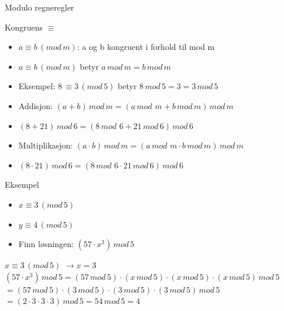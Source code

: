 \begin{frame}{Modulo regneregler}
\begin{block}{Kongruens $\equiv$}
\begin{itemize}
\item $a \equiv b\, (mod\, m)$: a og b kongruent i forhold til mod m
\item $a \equiv b\, (mod\, m)$ betyr $a\, mod\, m=b\, mod\, m$
\item Eksempel: $8\, \equiv 3\, (mod\, 5)$ betyr $8\, mod\, 5=3=3\, mod\, 5$ 
\end{itemize}
\end{block}

\begin{itemize}
\item Addisjon: $(a+b)\, mod\, m = (a\,mod\, \,m + b\, mod\, m)\, mod\, m$
\item $(8+21)\, mod\, 6 = (8\,mod\, \,6 + 21\, mod\, 6)\, mod\, 6$
\item Multiplikasjon: $(a\cdot b)\, mod\, m = (a\,mod\, \,m \cdot b\, mod\, m)\, mod\, m$
\item $(8\cdot21)\, mod\, 6 = (8\,mod\, \,6 \cdot 21\, mod\, 6)\, mod\, 6$
\end{itemize}
\end{frame}

\begin{frame}{}
\begin{exampleblock}{Eksempel}
\begin{itemize}
\item $x \equiv 3\,(mod\, 5)$
\item $y \equiv 4\,(mod\, 5)$
\item Finn løsningen: $(57\cdot x^3)\, mod\,5$
\end{itemize}
\end{exampleblock}
\medskip

$x \equiv 3\,(mod\, 5)$ $\rightarrow x=3$\\
$(57\cdot x^3)\, mod\,5=(57\, mod\, 5)\cdot (x\, mod\, 5)\cdot (x\, mod\, 5)\cdot (x\, mod\, 5)\, mod\, 5$\\
$=(57\, mod\, 5)\cdot (3\, mod\, 5)\cdot (3\, mod\, 5)\cdot (3\, mod\, 5)\, mod\, 5$\\
$=(2\cdot 3\cdot 3\cdot 3)\, mod\, 5=54\, mod\, 5=4$
\end{frame}

